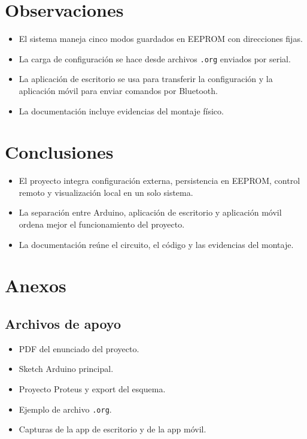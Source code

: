 \documentclass[12pt,a4paper]{article}
\begin{document}
\section{Observaciones}
\begin{itemize}[leftmargin=1.2cm]
    \item El sistema maneja cinco modos guardados en EEPROM con direcciones fijas.
    \item La carga de configuración se hace desde archivos \texttt{.org} enviados por serial.
    \item La aplicación de escritorio se usa para transferir la configuración y la aplicación móvil para enviar comandos por Bluetooth.
    \item La documentación incluye evidencias del montaje físico.
\end{itemize}

\section{Conclusiones}
\begin{itemize}[leftmargin=1.2cm]
    \item El proyecto integra configuración externa, persistencia en EEPROM, control remoto y visualización local en un solo sistema.
    \item La separación entre Arduino, aplicación de escritorio y aplicación móvil ordena mejor el funcionamiento del proyecto.
    \item La documentación reúne el circuito, el código y las evidencias del montaje.
\end{itemize}

\section{Anexos}

\subsection{Archivos de apoyo}
\begin{itemize}[leftmargin=1.2cm]
    \item PDF del enunciado del proyecto.
    \item Sketch Arduino principal.
    \item Proyecto Proteus y export del esquema.
    \item Ejemplo de archivo \texttt{.org}.
    \item Capturas de la app de escritorio y de la app móvil.
\end{itemize}
\end{document}
